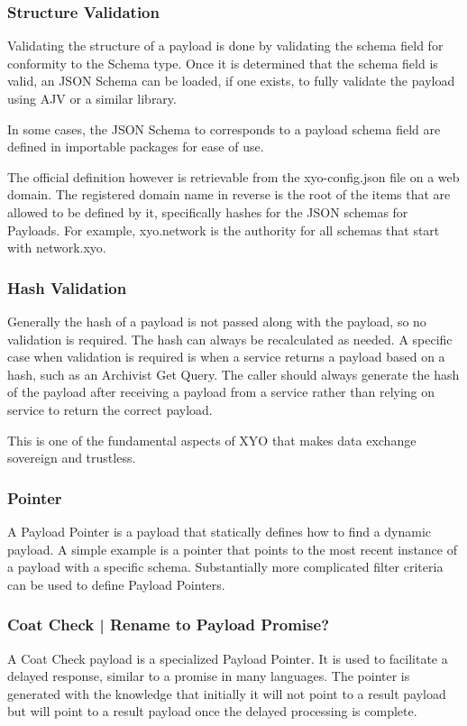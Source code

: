 \documentclass{article}
\begin{document}
\subsubsection{Structure Validation}
Validating the structure of a payload is done by validating the schema field for conformity to the Schema type.  Once it is determined that the schema field is valid, an JSON Schema can be loaded, if one exists, to fully validate the payload using AJV or a similar library. 

In some cases, the JSON Schema to corresponds to a payload schema field are defined in importable packages for ease of use.

The official definition however is retrievable from the xyo-config.json file on a web domain.  The registered domain name in reverse is the root of the items that are allowed to be defined by it, specifically hashes for the JSON schemas for Payloads.  For example, xyo.network is the authority for all schemas that start with network.xyo. 

\subsubsection{Hash Validation}
Generally the hash of a payload is not passed along with the payload, so no validation is required.  The hash can always be recalculated as needed.  A specific case when validation is required is when a service returns a payload based on a hash, such as an Archivist Get Query. The caller should always generate the hash of the payload after receiving a payload from a service rather than relying on service to return the correct payload.

This is one of the fundamental aspects of XYO that makes data exchange sovereign and trustless.

\subsubsection{Pointer}
A Payload Pointer is a payload that statically defines how to find a dynamic payload.  A simple example is a pointer that points to the most recent instance of a payload with a specific schema.  Substantially more complicated filter criteria can be used to define Payload Pointers.
\subsubsection{Coat Check | Rename to Payload Promise?}
A Coat Check payload is a specialized Payload Pointer.  It is used to facilitate a delayed response, similar to a promise in many languages.  The pointer is generated with the knowledge that initially it will not point to a result payload but will point to a result payload once the delayed processing is complete.
\end{document}
